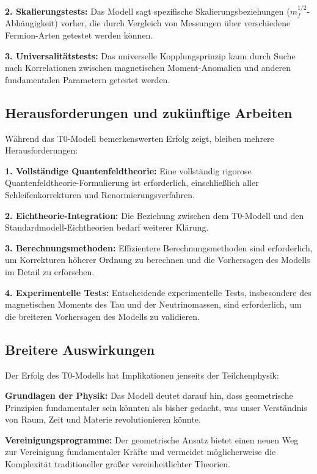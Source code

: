 \documentclass[12pt,a4paper]{article}
\begin{document}
\textbf{2. Skalierungstests:}
Das Modell sagt spezifische Skalierungsbeziehungen ($m_f^{1/2}$-Abhängigkeit) vorher, die durch Vergleich von Messungen über verschiedene Fermion-Arten getestet werden können.

\textbf{3. Universalitätstests:}
Das universelle Kopplungsprinzip kann durch Suche nach Korrelationen zwischen magnetischen Moment-Anomalien und anderen fundamentalen Parametern getestet werden.

\subsection{Herausforderungen und zukünftige Arbeiten}

Während das T0-Modell bemerkenswerten Erfolg zeigt, bleiben mehrere Herausforderungen:

\textbf{1. Vollständige Quantenfeldtheorie:}
Eine vollständig rigorose Quantenfeldtheorie-Formulierung ist erforderlich, einschließlich aller Schleifenkorrekturen und Renormierungsverfahren.

\textbf{2. Eichtheorie-Integration:}
Die Beziehung zwischen dem T0-Modell und den Standardmodell-Eichtheorien bedarf weiterer Klärung.

\textbf{3. Berechnungsmethoden:}
Effizientere Berechnungsmethoden sind erforderlich, um Korrekturen höherer Ordnung zu berechnen und die Vorhersagen des Modells im Detail zu erforschen.

\textbf{4. Experimentelle Tests:}
Entscheidende experimentelle Tests, insbesondere des magnetischen Moments des Tau und der Neutrinomassen, sind erforderlich, um die breiteren Vorhersagen des Modells zu validieren.

\subsection{Breitere Auswirkungen}

Der Erfolg des T0-Modells hat Implikationen jenseits der Teilchenphysik:

\textbf{Grundlagen der Physik:}
Das Modell deutet darauf hin, dass geometrische Prinzipien fundamentaler sein könnten als bisher gedacht, was unser Verständnis von Raum, Zeit und Materie revolutionieren könnte.

\textbf{Vereinigungsprogramme:}
Der geometrische Ansatz bietet einen neuen Weg zur Vereinigung fundamentaler Kräfte und vermeidet möglicherweise die Komplexität traditioneller großer vereinheitlichter Theorien.
\end{document}

